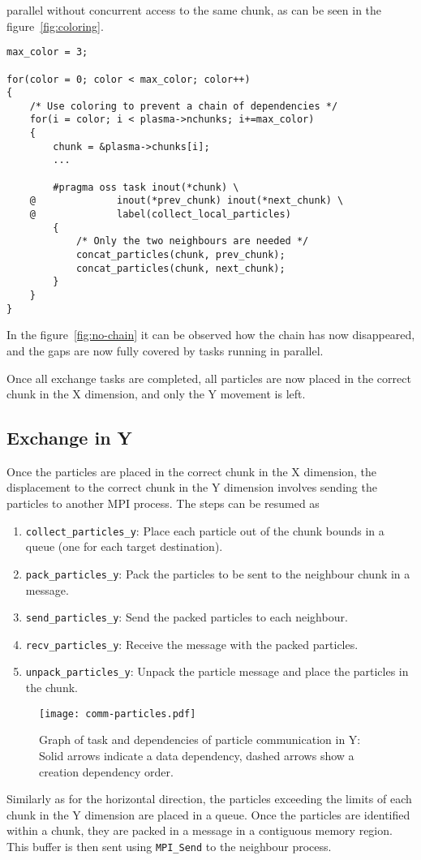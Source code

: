 parallel without concurrent access to the same chunk, as can be seen in the 
figure~\ref{fig:coloring}.
%
\begin{lstlisting}
max_color = 3;

for(color = 0; color < max_color; color++)
{
	/* Use coloring to prevent a chain of dependencies */
	for(i = color; i < plasma->nchunks; i+=max_color)
	{
		chunk = &plasma->chunks[i];
		...

		#pragma oss task inout(*chunk) \
	@              inout(*prev_chunk) inout(*next_chunk) \
	@              label(collect_local_particles)
		{
			/* Only the two neighbours are needed */
			concat_particles(chunk, prev_chunk);
			concat_particles(chunk, next_chunk);
		}
	}
}
\end{lstlisting}
%
In the figure~\ref{fig:no-chain} it can be observed how the chain has now 
disappeared, and the gaps are now fully covered by tasks running in parallel.

Once all exchange tasks are completed, all particles are now placed in the 
correct chunk in the X dimension, and only the Y movement is left.

\subsection{Exchange in Y}
Once the particles are placed in the correct chunk in the X dimension, the 
displacement to the correct chunk in the Y dimension involves sending the 
particles to another MPI process. The steps can be resumed as
%
\begin{enumerate}
\item \texttt{collect\_particles\_y}: Place each particle out of the chunk 
bounds in a queue (one for each target destination).
\item \texttt{pack\_particles\_y}: Pack the particles to be sent to the 
neighbour chunk in a message.
\item \texttt{send\_particles\_y}: Send the packed particles to each neighbour.
\item \texttt{recv\_particles\_y}: Receive the message with the packed 
particles.
\item \texttt{unpack\_particles\_y}: Unpack the particle message and place the 
particles in the chunk.
\end{enumerate}
%
\begin{figure}
\centering
\texttt{[image: comm-particles.pdf]}
\caption{Graph of task and dependencies of particle communication in Y: Solid 
arrows indicate a data dependency, dashed arrows show a creation dependency 
order.}
\label{fig:comm_y}
\end{figure}
%
Similarly as for the horizontal direction, the particles exceeding the limits of 
each chunk in the Y dimension are placed in a queue.  Once the particles are 
identified within a chunk, they are packed in a message in a contiguous memory 
region. This buffer is then sent using \texttt{MPI\_Send} to the neighbour 
process.

